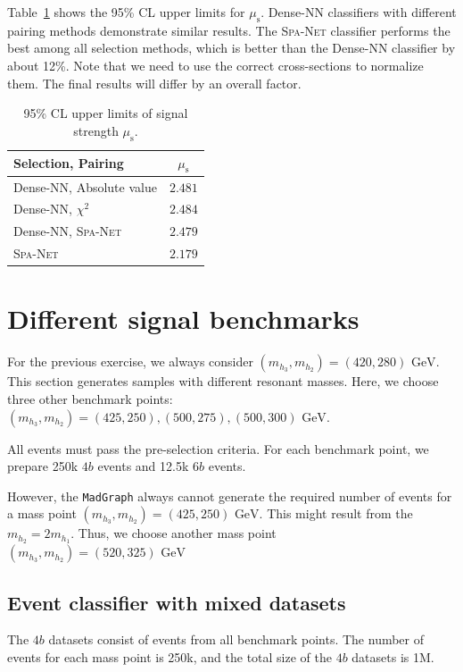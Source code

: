 \documentclass[12pt]{article}
\begin{document}
         Table~\ref{tab:signal_strength_upper_limit_1M_tem} shows the 95\% CL upper limits for $\mu_{\text{s}}$. Dense-NN classifiers with different pairing methods demonstrate similar results. The \textsc{Spa-Net} classifier performs the best among all selection methods, which is better than the Dense-NN classifier by about 12\%. Note that we need to use the correct cross-sections to normalize them. The final results will differ by an overall factor.
        \begin{table}[htpb]
            \centering
            \caption{95\% CL upper limits of signal strength $\mu_{\text{s}}$.}
            \label{tab:signal_strength_upper_limit_1M_tem}
            \begin{tabular}{l|c}
                Selection, Pairing         & $\mu_{\text{s}}$ \\ \hline
                Dense-NN, Absolute value   & $2.481$          \\
                Dense-NN, $\chi^2$         & $2.484$          \\
                Dense-NN, \textsc{Spa-Net} & $2.479$          \\
                \textsc{Spa-Net}           & $2.179$         
            \end{tabular}
        \end{table}
\section{Different signal benchmarks}%
\label{sec:different_signal_benchmarks}
    For the previous exercise, we always consider $(m_{h_3}, m_{h_2}) = (420, 280) \text{ GeV}$. This section generates samples with different resonant masses. Here, we choose three other benchmark points: $(m_{h_3}, m_{h_2}) = (425, 250), (500, 275), (500, 300) \text{ GeV}$.

    All events must pass the pre-selection criteria. For each benchmark point, we prepare 250k $4b$ events and 12.5k $6 b$ events.

    However, the \verb|MadGraph| always cannot generate the required number of events for a mass point $(m_{h_3}, m_{h_2}) = (425, 250) \text{ GeV}$. This might result from the $m_{h_2} = 2m_{h_1}$. Thus, we choose another mass point $(m_{h_3}, m_{h_2}) = (520, 325) \text{ GeV}$

    \subsection{Event classifier with mixed datasets}%
    \label{sub:event_classifier_with_mixed_datasets}
        The $4b$ datasets consist of events from all benchmark points. The number of events for each mass point is 250k, and the total size of the $4b$ datasets is 1M.
\end{document}
